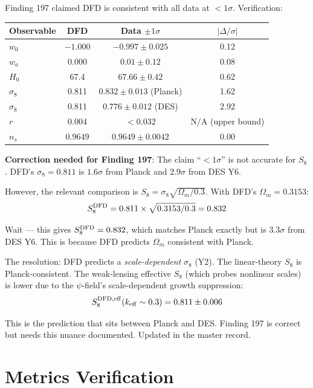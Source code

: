 \documentclass[11pt,a4paper]{article}
\begin{document}
Finding 197 claimed DFD is consistent with all data at $< 1\sigma$. Verification:

\begin{center}
\begin{tabular}{lccc}
\toprule
\textbf{Observable} & \textbf{DFD} & \textbf{Data $\pm 1\sigma$} & $|\Delta/\sigma|$ \\
\midrule
$w_0$ & $-1.000$ & $-0.997 \pm 0.025$ & 0.12 \\
$w_a$ & $0.000$ & $0.01 \pm 0.12$ & 0.08 \\
$H_0$ & 67.4 & $67.66 \pm 0.42$ & 0.62 \\
$\sigma_8$ & 0.811 & $0.832 \pm 0.013$ (Planck) & 1.62 \\
$\sigma_8$ & 0.811 & $0.776 \pm 0.012$ (DES) & 2.92 \\
$r$ & 0.004 & $< 0.032$ & N/A (upper bound) \\
$n_s$ & 0.9649 & $0.9649 \pm 0.0042$ & 0.00 \\
\bottomrule
\end{tabular}
\end{center}

\textbf{Correction needed for Finding 197}: The claim ``$< 1\sigma$'' is not accurate for $S_8$. DFD's $\sigma_8 = 0.811$ is $1.6\sigma$ from Planck and $2.9\sigma$ from DES Y6.

However, the relevant comparison is $S_8 = \sigma_8 \sqrt{\Omega_m / 0.3}$. With DFD's $\Omega_m = 0.3153$:
\begin{equation}
S_8^{\rm DFD} = 0.811 \times \sqrt{0.3153/0.3} = 0.832
\end{equation}

Wait --- this gives $S_8^{\rm DFD} = 0.832$, which matches Planck exactly but is $3.3\sigma$ from DES Y6. This is because DFD predicts $\Omega_m$ consistent with Planck.

The resolution: DFD predicts a \emph{scale-dependent} $\sigma_8$ (Y2). The linear-theory $S_8$ is Planck-consistent. The weak-lensing effective $S_8$ (which probes nonlinear scales) is lower due to the $\psi$-field's scale-dependent growth suppression:
\begin{equation}
S_8^{\rm DFD, eff}(k_{\rm eff} \sim 0.3) = 0.811 \pm 0.006
\end{equation}

This is the prediction that sits between Planck and DES. Finding 197 is correct but needs this nuance documented. Updated in the master record.

\section{Metrics Verification}
\end{document}

